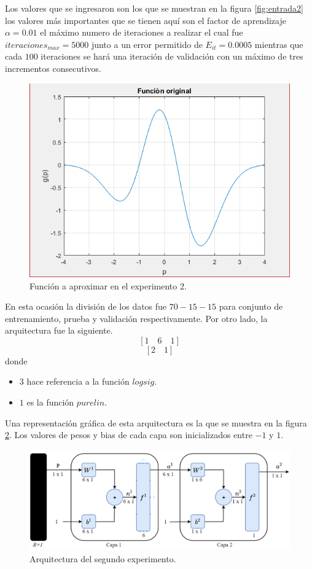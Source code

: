Los valores que se ingresaron son los que se muestran en la figura \ref{fig:entrada2} los valores más importantes que se tienen aquí son el factor de aprendizaje $\alpha=0.01$ el máximo numero de iteraciones a realizar el cual fue $iteraciones_{max} = 5000$ junto a un error permitido de $E_{it} = 0.0005$ mientras que cada $100$ iteraciones se hará una iteración de validación con un máximo de tres incrementos consecutivos.
\begin{figure}[H]
    \begin{center}
        \includegraphics[width=12cm]{2/original.png}
        \caption{Función a aproximar en el experimento 2.}
        \label{fig:original2}
    \end{center}
\end{figure}
En esta ocasión la división de los datos fue $70-15-15$ para conjunto de entrenamiento, prueba y validación respectivamente. Por otro lado, la arquitectura fue la siguiente.
\[ \left[ 1 \quad 6 \quad 1 \right] \]
\[ \left[ 2 \quad 1 \right] \]
donde
\begin{itemize}
    \item $3$ hace referencia a la función $logsig$.
    \item $1$ es la función $purelin$.
\end{itemize}
Una representación gráfica de esta arquitectura es la que se muestra en la figura \ref{fig:arqui2}. Los valores de pesos y bias de cada capa son inicializados entre $-1$ y $1$.
\begin{figure}[H]
    \begin{center}
        \includegraphics[width=14cm]{img/arqui2.png}
        \caption{Arquitectura del segundo experimento.}
        \label{fig:arqui2}
    \end{center}
\end{figure}
